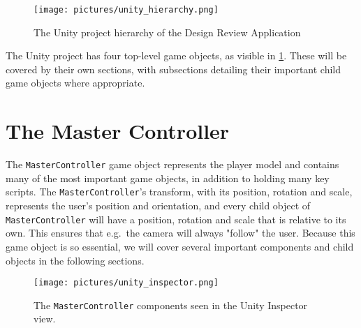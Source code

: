 \begin{figure}%
	\texttt{[image: pictures/unity\_hierarchy.png]}
	\caption[The Unity project hierarchy of the Design Review Application]{The Unity project hierarchy of the Design Review Application}
	\label{fig:unity_hierarchy}
\end{figure} 

The Unity project has four top-level game objects, as visible in \ref{fig:unity_hierarchy}. 
These will be covered by their own sections, with subsections detailing their important child game objects where appropriate.


\section{The Master Controller}
The \texttt{MasterController} game object represents the player model and contains many of the most important game objects, in addition to
holding many key scripts. The \texttt{MasterController}'s transform, with its position, rotation and scale, represents the user's position and orientation, 
and every child object of \texttt{MasterController} will have a position, rotation and scale that is relative to its own. This ensures
that e.g.~the camera will always "follow" the user. Because this game object is so essential, we will cover several important components and
child objects in the following sections.

\begin{figure}%
	\texttt{[image: pictures/unity\_inspector.png]}
	\caption[The \texttt{MasterController} components]{The \texttt{MasterController} components seen in the Unity Inspector view.}
	\label{fig:unity_inspector}
\end{figure} 

